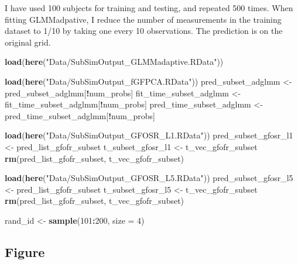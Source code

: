\documentclass[
]{article}
\newenvironment{Shaded}{\begin{snugshade}}{\end{snugshade}}
\newcommand{\AttributeTok}[1]{\textcolor[rgb]{0.13,0.29,0.53}{#1}}
\newcommand{\DecValTok}[1]{\textcolor[rgb]{0.00,0.00,0.81}{#1}}
\newcommand{\FunctionTok}[1]{\textcolor[rgb]{0.13,0.29,0.53}{\textbf{#1}}}
\newcommand{\NormalTok}[1]{#1}
\newcommand{\OtherTok}[1]{\textcolor[rgb]{0.56,0.35,0.01}{#1}}
\newcommand{\SpecialCharTok}[1]{\textcolor[rgb]{0.81,0.36,0.00}{\textbf{#1}}}
\newcommand{\StringTok}[1]{\textcolor[rgb]{0.31,0.60,0.02}{#1}}
\begin{document}
I have used 100 subjects for training and testing, and repeated 500
times. When fitting GLMMadpative, I reduce the number of measurements in
the training dataset to 1/10 by taking one every 10 observations. The
prediction is on the original grid.

\begin{Shaded}
\begin{Highlighting}[]
\FunctionTok{load}\NormalTok{(}\FunctionTok{here}\NormalTok{(}\StringTok{"Data/SubSimOutput\_GLMMadaptive.RData"}\NormalTok{))}

\FunctionTok{load}\NormalTok{(}\FunctionTok{here}\NormalTok{(}\StringTok{"Data/SubSimOutput\_fGFPCA.RData"}\NormalTok{))}
\NormalTok{pred\_subset\_adglmm }\OtherTok{\textless{}{-}}\NormalTok{ pred\_subset\_adglmm[}\SpecialCharTok{!}\NormalTok{num\_probs]}
\NormalTok{fit\_time\_subset\_adglmm }\OtherTok{\textless{}{-}}\NormalTok{ fit\_time\_subset\_adglmm[}\SpecialCharTok{!}\NormalTok{num\_probs]}
\NormalTok{pred\_time\_subset\_adglmm }\OtherTok{\textless{}{-}}\NormalTok{ pred\_time\_subset\_adglmm[}\SpecialCharTok{!}\NormalTok{num\_probs]}

\FunctionTok{load}\NormalTok{(}\FunctionTok{here}\NormalTok{(}\StringTok{"Data/SubSimOutput\_GFOSR\_L1.RData"}\NormalTok{))}
\NormalTok{pred\_subset\_gfosr\_l1 }\OtherTok{\textless{}{-}}\NormalTok{ pred\_list\_gfofr\_subset}
\NormalTok{t\_subset\_gfosr\_l1 }\OtherTok{\textless{}{-}}\NormalTok{ t\_vec\_gfofr\_subset}
\FunctionTok{rm}\NormalTok{(pred\_list\_gfofr\_subset, t\_vec\_gfofr\_subset)}

\FunctionTok{load}\NormalTok{(}\FunctionTok{here}\NormalTok{(}\StringTok{"Data/SubSimOutput\_GFOSR\_L5.RData"}\NormalTok{))}
\NormalTok{pred\_subset\_gfosr\_l5 }\OtherTok{\textless{}{-}}\NormalTok{ pred\_list\_gfofr\_subset}
\NormalTok{t\_subset\_gfosr\_l5 }\OtherTok{\textless{}{-}}\NormalTok{ t\_vec\_gfofr\_subset}
\FunctionTok{rm}\NormalTok{(pred\_list\_gfofr\_subset, t\_vec\_gfofr\_subset)}

\NormalTok{rand\_id }\OtherTok{\textless{}{-}} \FunctionTok{sample}\NormalTok{(}\DecValTok{101}\SpecialCharTok{:}\DecValTok{200}\NormalTok{, }\AttributeTok{size =} \DecValTok{4}\NormalTok{)}
\end{Highlighting}
\end{Shaded}

\hypertarget{figure}{%
\subsection{Figure}\label{figure}}
\end{document}
